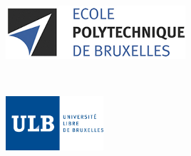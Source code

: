 \documentclass[11pt,a4paper,11pt]{report}
\begin{document}
\renewcommand\thesection{\arabic{section}}

\begin{titlepage}

\newcommand{\HRule}{\rule{\linewidth}{0.6mm}} %

\center %
 

\emph{} \\
\begin{minipage}{0.45\textwidth}
\begin{flushleft} 
\includegraphics[height=2cm] {images/logopolytech.jpg}\\
\end{flushleft}
\end{minipage}
~
\begin{minipage}{0.45\textwidth}
\begin{flushright} 
\includegraphics[height=2cm] {images/logoulb.jpg}\\
\end{flushright}
\end{minipage}\\[1.5cm]


 


\end{titlepage}
\end{document}
